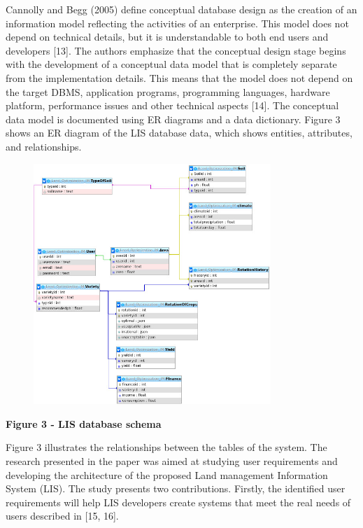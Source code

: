 Cannolly and Begg (2005) define conceptual database design as the
creation of an information model reflecting the activities of an
enterprise. This model does not depend on technical details, but it is
understandable to both end users and developers {[}13{]}. The authors
emphasize that the conceptual design stage begins with the development
of a conceptual data model that is completely separate from the
implementation details. This means that the model does not depend on the
target DBMS, application programs, programming languages, hardware
platform, performance issues and other technical aspects {[}14{]}. The
conceptual data model is documented using ER diagrams and a data
dictionary. Figure 3 shows an ER diagram of the LIS database data, which
shows entities, attributes, and relationships.

\begin{figure}[H]
	\centering
	\includegraphics[width=0.8\textwidth]{assets/70}
	\caption*{}
\end{figure}

\textbf{Figure 3 - LIS database schema}

Figure 3 illustrates the relationships between the tables of the system.
The research presented in the paper was aimed at studying user
requirements and developing the architecture of the proposed Land
management Information System (LIS). The study presents two
contributions. Firstly, the identified user requirements will help LIS
developers create systems that meet the real needs of users described in
{[}15, 16{]}.

